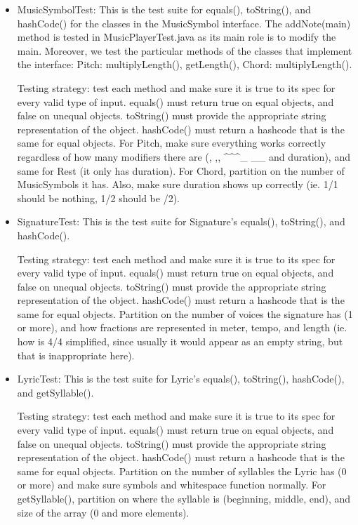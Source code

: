 \documentclass[12pt]{book}
\begin{document}
\begin{itemize}
\item MusicSymbolTest:  This is the test suite for equals(), toString(), and hashCode() for the classes in the MusicSymbol interface. The addNote(main) method is tested in MusicPlayerTest.java as its main role is to modify the main.
Moreover, we test the particular methods of the classes that implement the interface: Pitch: multiplyLength(), getLength(), Chord: multiplyLength().

Testing strategy: test each method and make sure it is true to its spec for every valid type of input. equals() must return true on equal objects, and false on unequal objects. toString() must provide the appropriate string representation of the object. hashCode() must return a hashcode that is the same for equal objects.
For Pitch, make sure everything works correctly regardless of how many modifiers there are (, ,, \textasciicircum \textasciicircum\textasciicircum \_ \_\_ and duration), and same for Rest (it only has duration). For Chord, partition on the number of MusicSymbols it has. Also, make sure duration shows up correctly (ie. 1/1 should be nothing, 1/2 should be /2).

\item SignatureTest:  This is the test suite for Signature's equals(), toString(), and hashCode().

Testing strategy: test each method and make sure it is true to its spec for every valid type of input. equals() must return true on equal objects, and false on unequal objects. toString() must provide the appropriate string representation of the object. hashCode() must return a hashcode that is the same for equal objects.
Partition on the number of voices the signature has (1 or more), and how fractions are represented in meter, tempo, and length (ie. how is 4/4 simplified, since usually it would appear as an empty string, but that is inappropriate here).

\item LyricTest: This is the test suite for Lyric's equals(), toString(), hashCode(), and getSyllable().

Testing strategy: test each method and make sure it is true to its spec for every valid type of input. equals() must return true on equal objects, and false on unequal objects. toString() must provide the appropriate string representation of the object. hashCode() must return a hashcode that is the same for equal objects.
Partition on the number of syllables the Lyric has (0 or more) and make sure symbols and whitespace function normally. For getSyllable(), partition on where the syllable is (beginning, middle, end), and size of the array (0 and more elements).

\end{itemize}






\newpage
\end{document}
